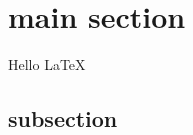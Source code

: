 \documentclass[]{article}
\begin{document}
\section{main section}
Hello \LaTeX 
\subsection{subsection}
\end{document}
